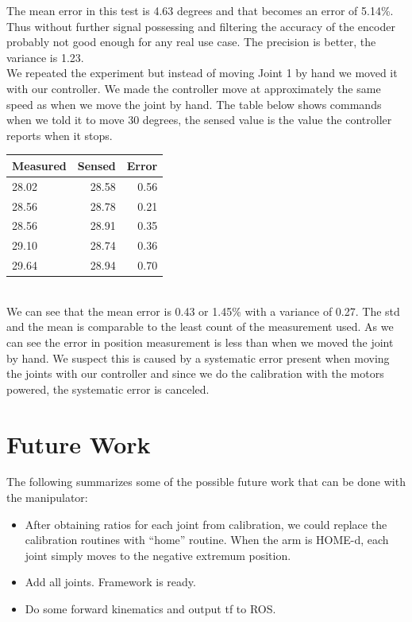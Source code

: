 \documentclass[10pt,a4paper]{article}
\begin{document}
The mean error in this test is 4.63 degrees and that becomes an error of 5.14\%. Thus without further signal possessing and filtering the accuracy of the encoder probably not good enough for any real use case. The precision is better, the variance is 1.23.\\

We repeated the experiment but instead of moving Joint 1 by hand we moved it with our controller. We made the controller move at approximately the same speed as when we move the joint by hand. The table below shows commands when we told it to move 30 degrees, the sensed value is the value the controller reports when it stops. \\

\begin{tabular}{ | l | r | r |}
\hline
\textbf{Measured} & \textbf{Sensed} & \textbf{Error} \\
\hline
 28.02 & 28.58 & 0.56  \\
\hline
 28.56	& 28.78 & 0.21 \\
\hline
 28.56 & 28.91 & 0.35 \\
\hline
 29.10 & 28.74 & 0.36 \\
\hline
 29.64 & 28.94 & 0.70\\
\hline
\end{tabular} \\

We can see that the mean error is 0.43 or 1.45\% with a variance of 0.27. The std and the mean is comparable to the least count of the measurement used.
As we can see the error in position measurement is less than when we moved the joint by hand. We suspect this is caused by a systematic error present when moving the joints with our controller and since we do the calibration with the motors powered, the systematic error is canceled.

\section{Future Work}

The following summarizes some of the possible future work that can be
done with the manipulator: 

\begin{itemize}
\item After obtaining ratios for each joint from calibration, we could
  replace the calibration routines with ``home'' routine. When the arm
  is HOME-d, each joint simply moves to the negative extremum
  position. 
\item Add all joints. Framework is ready.
\item Do some forward kinematics and output tf to ROS.
\end{itemize}



\end{document}
